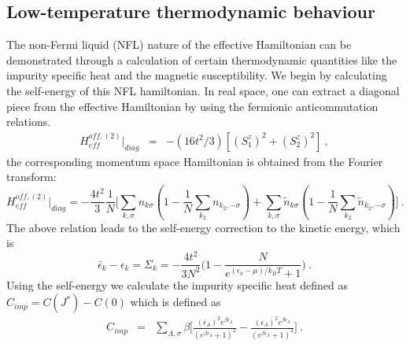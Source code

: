 \documentclass[reprint,onecolumn,prb,superscriptaddress]{revtex4-2}
\begin{document}
\subsection{Low-temperature thermodynamic behaviour}
The non-Fermi liquid (NFL) nature of the effective Hamiltonian can be demonstrated through a calculation of certain thermodynamic quantities like the impurity specific heat and the magnetic susceptibility. We begin by calculating the self-energy of this NFL hamiltonian. In real space, one can extract a diagonal piece from the effective Hamiltonian by using the fermionic anticommutation relations.
\begin{eqnarray}
H_{eff}^{off,(2)} |_{diag} &=& -(16t^2/3) [ (S_1^z)^2+ (S_2^z)^2 ] ~,
\end{eqnarray}
the corresponding momentum space Hamiltonian is obtained from the Fourier transform:
\begin{equation}
H_{eff}^{off,(2)} |_{diag}= -\frac{4t^2}{3} \frac{1}{N} \bigg[ \displaystyle\sum_{k,\sigma} n_{k\sigma}(1-\frac{1}{N} \displaystyle\sum_{k_2}  n_{k_2,-\sigma}  ) + \displaystyle\sum_{k,\sigma} \tilde{n}_{k\sigma} ( 1-\frac{1}{N} \displaystyle\sum_{ k_2} \tilde{n}_{k_2,-\sigma}  ) \bigg]~.
\end{equation}
The above relation leads to the self-energy correction to the kinetic energy, which is
\begin{equation}
\bar{\epsilon} _k-\epsilon_k = \Sigma_k = -\frac{4t^2}{3N^2}\bigg(1-\frac{N}{e^{(\epsilon_k-\mu)/k_BT}+1}\bigg)~.
\label{eq:self-energy-NFL}
\end{equation}
Using the self-energy we calculate the impurity specific heat defined as $C_{imp}=C(J^*)-C(0)$ which is defined as
\begin{eqnarray}
C_{imp} &=& \sum_{\Lambda,\sigma} \beta \bigg[ \frac{(\bar{\epsilon}_{\Lambda})^2 e^{\beta \bar{\epsilon}_{\Lambda}}}{( e^{\beta \bar{\epsilon}_{\Lambda}} +1)^2}  -\frac{({\epsilon}_{\Lambda})^2 e^{\beta {\epsilon}_{\Lambda}}}{( e^{\beta {\epsilon}_{\Lambda}} +1)^2} \bigg]~.
\end{eqnarray}
\end{document}
